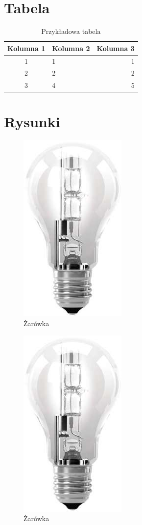 \documentclass[12pt,a4paper]{article}
\begin{document}
\newpage
\section{Tabela}

\begin{table}[h]
\centering
\caption{Przykładowa tabela}
\label{tab:tab1}
\begin{tabular}{|c|l|r|}
\hline
Kolumna 1 & Kolumna 2 & Kolumna 3 \\
\hline
1 & 1 & 1 \\
2 & 2 & 2 \\
3 & 4 & 5 \\
\hline
\end{tabular}
\end{table}

\newpage
\section{Rysunki}

\begin{figure}[h]
\centerline{
	\includegraphics{Rysunek2.jpg}
}
\caption{Żarówka}
\label{rys1}
\end{figure} 

\begin{figure}
\centerline{
	\includegraphics[scale=0.35]{Rysunek2.jpg}
}
\caption{Żarówka}
\label{rys2}
\end{figure}
\end{document}
